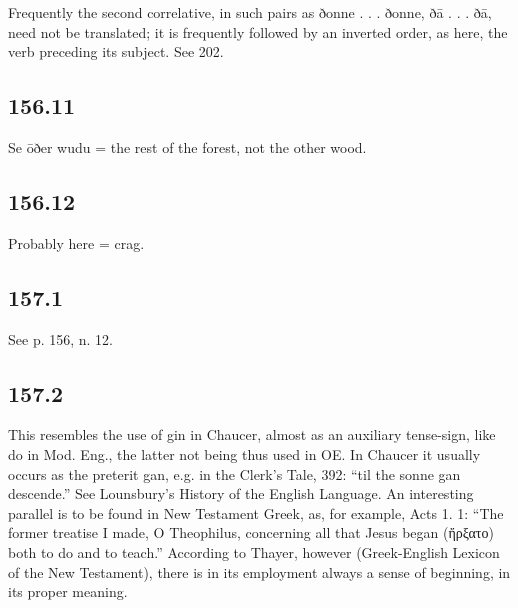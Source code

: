 Frequently the second correlative, in such pairs as ðonne . . . ðonne, ðā . . . ðā, need not be translated; it is frequently followed by an inverted order, as here, the verb preceding its subject. See 202.

\subsection*{156.11}

Se ōðer wudu = the rest of the forest, not the other wood.

\subsection*{156.12}

Probably here = crag.

\subsection*{157.1}

See p. 156, n. 12.

\subsection*{157.2}

This resembles the use of gin in Chaucer, almost as an auxiliary tense-sign, like do in Mod. Eng., the latter not being thus used in OE. In Chaucer it usually occurs as the preterit gan, e.g. in the Clerk’s Tale, 392: “til the sonne gan descende.” See Lounsbury’s History of the English Language. An interesting parallel is to be found in New Testament Greek, as, for example, Acts 1. 1: “The former treatise I made, O Theophilus, concerning all that Jesus began (ἤρξατο) both to do and to teach.” According to Thayer, however (Greek-English Lexicon of the New Testament), there is in its employment always a sense of beginning, in its proper meaning.

